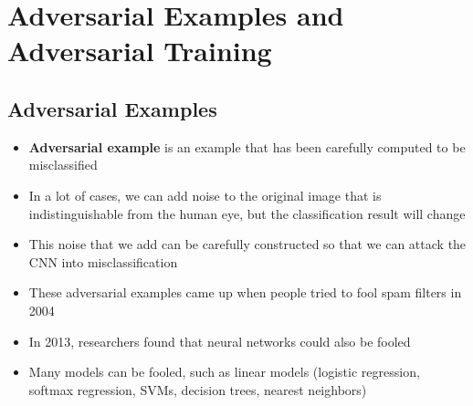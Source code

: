 \section{Adversarial Examples and Adversarial Training}
\subsection{Adversarial Examples}
\begin{itemize}
	\item \textbf{Adversarial example} is an example that has been carefully computed to be misclassified
	\item In a lot of cases, we can add noise to the original image that is indistinguishable from the human eye, but the classification result will change
	\item This noise that we add can be carefully constructed so that we can attack the CNN into misclassification
	\item These adversarial examples came up when people tried to fool spam filters in 2004
	\item In 2013, researchers found that neural networks could also be fooled
	\item Many models can be fooled, such as linear models (logistic regression, softmax regression, SVMs, decision trees, nearest neighbors)
\end{itemize}

